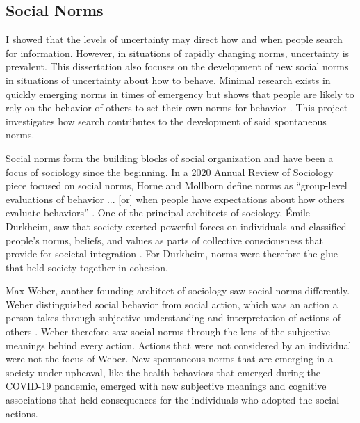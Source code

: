 \subsection{Social Norms}
I showed that the levels of uncertainty may direct how and when people search
for information. However, in situations of rapidly changing norms, uncertainty
is prevalent. This dissertation also focuses on the development of new social
norms in situations of uncertainty about how to behave. Minimal research exists
in quickly emerging norms in times of emergency but shows that people are likely
to rely on the behavior of others to set their own norms for behavior
\citep{alvarez2018, horneNormsIntegratedFramework2020}. This project
investigates how search contributes to the development of said spontaneous
norms.

Social norms form the building blocks of social organization and have been a
focus of sociology since the beginning. In a 2020 Annual Review of Sociology
piece focused on social norms, Horne and Mollborn define norms as ``group-level
evaluations of behavior ... [or] when people have expectations about how others
evaluate behaviors'' \citeyearpar[p. 468-69]{horneNormsIntegratedFramework2020}.
One of the principal architects of sociology, \'{E}mile Durkheim, saw that
society exerted powerful forces on individuals and classified people's norms,
beliefs, and values as parts of collective consciousness that provide for
societal integration \citeyearpar{durkheimSuicide1897,
durkheimDivisionLaborSociety1933}. For Durkheim, norms were therefore the glue
that held society together in cohesion.

Max Weber, another founding architect of sociology saw social norms differently.
Weber distinguished social behavior from social action, which was an action a
person takes through subjective understanding and interpretation of actions of
others \citeyearpar{weber1978economy}. Weber therefore saw social norms through
the lens of the subjective meanings behind every action. Actions that were not
considered by an individual were not the focus of Weber. New spontaneous norms
that are emerging in a society under upheaval, like the health behaviors that
emerged during the COVID-19 pandemic, emerged with new subjective meanings and
cognitive associations that held consequences for the individuals who adopted
the social actions.

